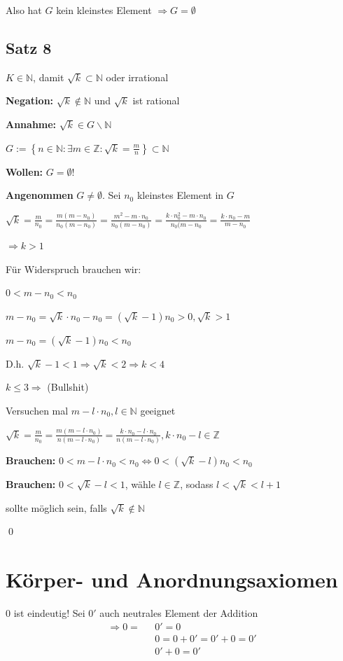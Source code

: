 \documentclass[fleqn]{scrbook}
\renewenvironment{proof}{{\bfseries Beweis }}{\qed}
\newenvironment{example}{{\bfseries Beispiel }}{}
\begin{document}
Also hat $G$ kein kleinstes Element $\Longrightarrow G = \emptyset$ 

\subsection{Satz 8}

$K \in \mathbb{N}$, damit $\sqrt{k} \subset \mathbb{N}$ oder irrational

\begin{proof}

\textbf{Negation:} $\sqrt{k} \notin \mathbb{N}$ und $\sqrt{k}$ ist rational

\textbf{Annahme:} $\sqrt{k} \in G \backslash \mathbb{N}$

$G:=\left\{ n \in \mathbb{N}: \exists m \in \mathbb{Z}: \sqrt{k} = \frac{m}{n} \right\} \subset \mathbb{N}$

\textbf{Wollen:} $G = \emptyset$!

\textbf{Angenommen} $G \neq \emptyset$. Sei $n_0$ kleinstes Element in $G$

$\sqrt{k} = \frac{m}{n_0} = \frac{m(m-n_0)}{n_0(m-n_0)} = \frac{m^2-m \cdot n_0}{n_0(m-n_0)} = \frac{k \cdot n_0^2-m \cdot n_0}{n_0(m-n_0} = \frac{k \cdot n_0-m}{m-n_0}$ 

$\Longrightarrow k>1$

Für Widerspruch brauchen wir:

$0<m-n_0<n_0$

$m-n_0 = \sqrt{k} \cdot n_0-n_0=(\sqrt{k}-1)n_0>0,\sqrt{k}>1$ 

$m-n_0 = (\sqrt{k}-1)n_0 < n_0$

D.h. $\sqrt{k} -1<1 \Longrightarrow \sqrt{k}<2 \Longrightarrow k<4$

$k \leq 3 \Longrightarrow $ (Bullshit)

Versuchen mal $m-l \cdot n_0,l \in \mathbb{N}$ geeignet

$\sqrt{k} = \frac{m}{n_0} = \frac{m(m-l \cdot n_0)}{n(m-l \cdot n_0)} = \frac{k \cdot n_0-l \cdot n_0}{n(m-l \cdot n_0)}, k \cdot n_0-l \in \mathbb{Z}$

\textbf{Brauchen:}  $0<m-l \cdot n_0<n_0 \Longleftrightarrow 0<(\sqrt{k}-l)n_0<n_0$ 

\textbf{Brauchen:}  $0<\sqrt{k}-l<1$, wähle $l \in \mathbb{Z}$, sodass $l < \sqrt{k}<l+1$

sollte möglich sein, falls $\sqrt{k} \notin \mathbb{N}$ 

\end{proof}

\section{Körper- und Anordnungsaxiomen}
  \begin{example}
    $0$ ist eindeutig!
    Sei $0'$ auch neutrales Element der Addition
    \begin{align*}
      \Longrightarrow 0 = \text{ }& 0' = 0\\
                      & 0  = 0+0'=0'+0=0'\\
                      & 0' + 0=0'
    \end{align*}
  \end{example}
\end{document}
